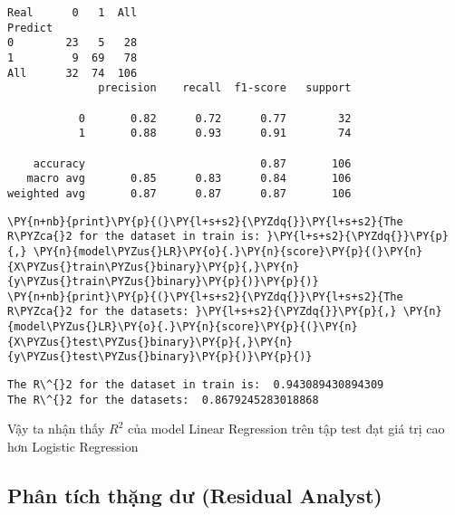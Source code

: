     \begin{Verbatim}[commandchars=\\\{\}]
Real      0   1  All
Predict
0        23   5   28
1         9  69   78
All      32  74  106
              precision    recall  f1-score   support

           0       0.82      0.72      0.77        32
           1       0.88      0.93      0.91        74

    accuracy                           0.87       106
   macro avg       0.85      0.83      0.84       106
weighted avg       0.87      0.87      0.87       106

    \end{Verbatim}

    \begin{tcolorbox}[breakable, size=fbox, boxrule=1pt, pad at break*=1mm,colback=cellbackground, colframe=cellborder]
\begin{Verbatim}[commandchars=\\\{\}]
\PY{n+nb}{print}\PY{p}{(}\PY{l+s+s2}{\PYZdq{}}\PY{l+s+s2}{The R\PYZca{}2 for the dataset in train is: }\PY{l+s+s2}{\PYZdq{}}\PY{p}{,} \PY{n}{model\PYZus{}LR}\PY{o}{.}\PY{n}{score}\PY{p}{(}\PY{n}{X\PYZus{}train\PYZus{}binary}\PY{p}{,}\PY{n}{y\PYZus{}train\PYZus{}binary}\PY{p}{)}\PY{p}{)}
\PY{n+nb}{print}\PY{p}{(}\PY{l+s+s2}{\PYZdq{}}\PY{l+s+s2}{The R\PYZca{}2 for the datasets: }\PY{l+s+s2}{\PYZdq{}}\PY{p}{,} \PY{n}{model\PYZus{}LR}\PY{o}{.}\PY{n}{score}\PY{p}{(}\PY{n}{X\PYZus{}test\PYZus{}binary}\PY{p}{,}\PY{n}{y\PYZus{}test\PYZus{}binary}\PY{p}{)}\PY{p}{)}
\end{Verbatim}
\end{tcolorbox}

    \begin{Verbatim}[commandchars=\\\{\}]
The R\^{}2 for the dataset in train is:  0.943089430894309
The R\^{}2 for the datasets:  0.8679245283018868
    \end{Verbatim}

    Vậy ta nhận thấy \(R^2\) của model Linear Regression trên tập test đạt
giá trị cao hơn Logistic Regression

    \hypertarget{phuxe2n-tuxedch-thux1eb7ng-dux1b0-residual-analyst}{%
\subsection{Phân tích thặng dư (Residual
Analyst)}\label{phuxe2n-tuxedch-thux1eb7ng-dux1b0-residual-analyst}}

